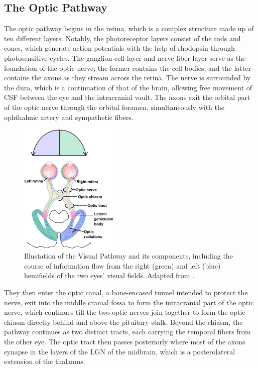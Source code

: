 \subsection{The Optic Pathway}

The optic pathway begins in the retina, which is a complex structure made up of ten different layers. Notably, the photoreceptor layers consist of the rods and cones, which generate action potentials with the help of rhodopsin through photosensitive cycles. The ganglion cell layer and nerve fiber layer serve as the foundation of the optic nerve; the former contains the cell bodies, and the latter contains the axons as they stream across the retina. The nerve is surrounded by the dura, which is a continuation of that of the brain, allowing free movement of \gls{CSF} between the eye and the intracranial vault. The axons exit the orbital part of the optic nerve through the orbital foramen, simultaneously with the ophthalmic artery and sympathetic fibers.

\clearpage

\begin{figure}
	\centering
	\includegraphics[width = 0.42\textwidth]{assets/images/Optic_Pathway.jpg}
	\caption[The Visual Pathway]{Illustation of the Visual Pathway and its components, including the course of information flow from the right (green) and left (blue) hemifields of the two eyes' visual fields. Adapted from \cite{optic_nerve}.}
	\label{fig:OpticPath}
\end{figure}

They then enter the optic canal, a bone-encased tunnel intended to protect the nerve, exit into the middle cranial fossa to form the intracranial part of the optic nerve, which continues till the two optic nerves join together to form the optic chiasm directly behind and above the pituitary stalk. Beyond the chiasm, the pathway continues as two distinct tracts, each carrying the temporal fibers from the other eye. The optic tract then passes posteriorly where most of the axons synapse in the layers of the \gls{LGN} of the midbrain, which is a posterolateral extension of the thalamus.

